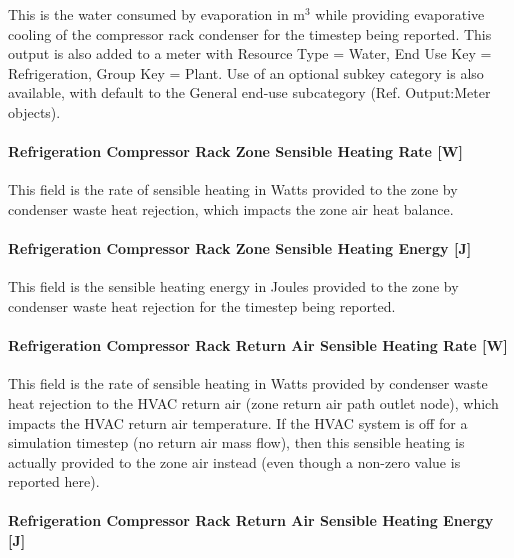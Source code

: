 This is the water consumed by evaporation in m\(^{3}\) while providing evaporative cooling of the compressor rack condenser for the timestep being reported. This output is also added to a meter with Resource Type = Water, End Use Key = Refrigeration, Group Key = Plant. Use of an optional subkey category is also available, with default to the General end-use subcategory (Ref. Output:Meter objects).

\paragraph{Refrigeration Compressor Rack Zone Sensible Heating Rate {[}W{]}}\label{refrigeration-compressor-rack-zone-sensible-heating-rate-w}

This field is the rate of sensible heating in Watts provided to the zone by condenser waste heat rejection, which impacts the zone air heat balance.

\paragraph{Refrigeration Compressor Rack Zone Sensible Heating Energy {[}J{]}}\label{refrigeration-compressor-rack-zone-sensible-heating-energy-j}

This field is the sensible heating energy in Joules provided to the zone by condenser waste heat rejection for the timestep being reported.

\paragraph{Refrigeration Compressor Rack Return Air Sensible Heating Rate {[}W{]}}\label{refrigeration-compressor-rack-return-air-sensible-heating-rate-w}

This field is the rate of sensible heating in Watts provided by condenser waste heat rejection to the HVAC return air (zone return air path outlet node), which impacts the HVAC return air temperature. If the HVAC system is off for a simulation timestep (no return air mass flow), then this sensible heating is actually provided to the zone air instead (even though a non-zero value is reported here).

\paragraph{Refrigeration Compressor Rack Return Air Sensible Heating Energy {[}J{]}}\label{refrigeration-compressor-rack-return-air-sensible-heating-energy-j}

